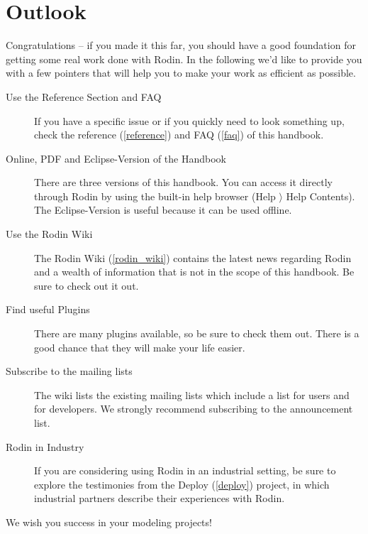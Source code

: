 \section{Outlook}
\label{tutorial_11}

Congratulations -- if you made it this far, you should have a good foundation for getting some real work done with Rodin.  In the following we'd like to provide you with a few pointers that will help you to make your work as efficient as possible.

\begin{description}
	\item[Use the Reference Section and FAQ] If you have a specific issue or if you quickly need to look something up, check the reference (\ref{reference}) and FAQ (\ref{faq}) of this handbook.
	\item[Online, PDF and Eclipse-Version of the Handbook] There are three versions of this handbook.  You can access it directly through Rodin by using the built-in help browser (\textsf{Help $\rangle$ Help Contents}).  The Eclipse-Version is useful because it can be used offline.
	\item[Use the Rodin Wiki] The Rodin Wiki (\ref{rodin_wiki}) contains the latest news regarding Rodin and a wealth of information that is not in the scope of this handbook.  Be sure to check out it out.
	\item[Find useful Plugins] There are many plugins available, so be sure to check them out.  There is a good chance that they will make your life easier.
	\item[Subscribe to the mailing lists] The wiki lists the existing mailing lists which include a list for users and for developers.  We strongly recommend subscribing to the announcement list.
	\item[Rodin in Industry] If you are considering using Rodin in an industrial setting, be sure to explore the testimonies from the Deploy (\ref{deploy}) project, in which industrial partners describe their experiences with Rodin.
\end{description}

We wish you success in your modeling projects!

